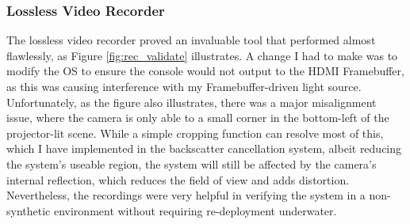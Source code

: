 \subsubsection{Lossless Video Recorder}
The lossless video recorder proved an invaluable tool that performed almost flawlessly, as Figure \ref{fig:rec_validate} illustrates. A change I had to make was to modify the OS to ensure the console would not output to the HDMI Framebuffer, as this was causing interference with my Framebuffer-driven light source. Unfortunately, as the figure also illustrates, there was a major misalignment issue, where the camera is only able to a small corner in the bottom-left of the projector-lit scene. While a simple cropping function can resolve most of this, which I have implemented in the backscatter cancellation system, albeit reducing the system's useable region, the system will still be affected by the camera's internal reflection, which reduces the field of view and adds distortion. Nevertheless, the recordings were very helpful in verifying the system in a non-synthetic environment without requiring re-deployment underwater.

